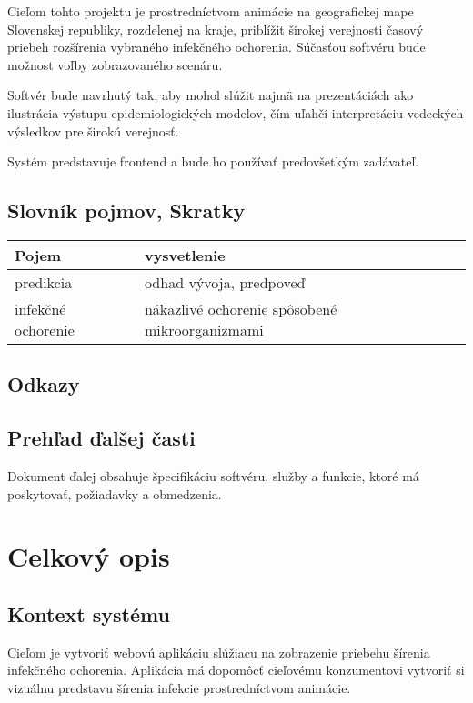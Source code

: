 \documentclass[12pt,a4paper]{report}
\begin{document}
Cieľom tohto projektu je prostredníctvom animácie na geografickej mape Slovenskej republiky, rozdelenej na kraje, priblížit širokej verejnosti časový priebeh rozšírenia vybraného infekčného ochorenia. Súčasťou softvéru bude možnost voľby zobrazovaného scenáru.  \par

Softvér bude navrhutý tak, aby mohol slúžit najmä na prezentáciách ako ilustrácia výstupu epidemiologických modelov, čím uľahčí interpretáciu vedeckých výsledkov pre širokú verejnosť.\par

Systém predstavuje frontend a bude ho používať predovšetkým zadávateľ.
\pagebreak
\section[Slovník pojmov, Skratky]{\rmfamily\bfseries
	Slovník pojmov, Skratky}	
	\begin{table}[h!]
		\centering
		\begin{tabular}{|>{\centering\arraybackslash}m{2in}|>{\centering\arraybackslash}m{1in}|}
			\hline
			\centering Pojem & vysvetlenie \\ [0ex]
			\hline
			predikcia & odhad vývoja, predpoveď \\ [0ex]
			\hline
			infekčné ochorenie & nákazlivé ochorenie spôsobené mikroorganizmami \\ [0ex]
			\hline
		\end{tabular}
	\end{table}

\section[Odkazy]{\rmfamily\bfseries
	Odkazy}

\section[Prehľad ďalšej časti]{\rmfamily\bfseries
	Prehľad ďalšej časti}
Dokument ďalej obsahuje špecifikáciu softvéru, služby a funkcie, ktoré má poskytovať, požiadavky a obmedzenia. 

\renewcommand{\chaptername}{}	
\chapter[Celkový opis]{\rmfamily\bfseries
	Celkový opis}

\section[Kontext systému]{\rmfamily\bfseries
	Kontext systému}
	Cieľom je vytvoriť webovú aplikáciu slúžiacu na zobrazenie priebehu šírenia infekčného ochorenia. Aplikácia má dopomôcť cieľovému konzumentovi vytvoriť si vizuálnu predstavu šírenia infekcie prostredníctvom animácie.
\end{document}
